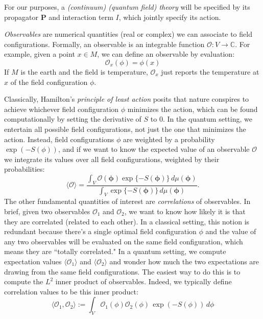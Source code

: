 \documentclass[12pt]{article}
\theoremstyle{definition}
\theoremstyle{plain}
\begin{document}
For our purposes, a \emph{(continuum) (quantum field) theory} will be specified by its propagator $\mathbf{P}$ and interaction term $I$, which jointly specify its action.

\textit{Observables} are numerical quantities (real or complex) we can associate to field configurations. Formally, an observable is an integrable function $\mathcal{O}:V \to \mathbb{C}$.
For example, given a point $x\in M$, we can define an observable by evaluation: 
\begin{equation}
    \mathcal{O}_x(\phi) = \phi(x)
\end{equation}
If $M$ is the earth and the field is temperature, $\mathcal{O}_x$ just reports the temperature at $x$ of the field configuration $\phi$. 

Classically, Hamilton's \textit{principle of least action} posits that nature conspires to achieve whichever field configuration $\phi$ minimizes the action, which can be found computationally by setting the derivative of $S$ to 0. In the quantum setting, we entertain all possible field configurations, not just the one that minimizes the action. Instead, field configurations $\phi$ are weighted by a probability $\exp(-S(\phi))$, and if we want to know the expected value of an observable $\mathcal{O}$ we integrate its values over all field configurations, weighted by their probabilities:
\begin{equation}
    \langle \mathcal{O} \rangle
    = \frac{\int_{V} \mathcal{O}(\boldsymbol\phi) \exp \{-S(\boldsymbol\phi)\} \, d\mu(\boldsymbol\phi)}{\int_{V}  \exp \{-S(\boldsymbol\phi)
    \} \, d\mu(\boldsymbol\phi)}
    .
\end{equation}
The other fundamental quantities of interest are \textit{correlations} of observables. In brief, given two observables $\mathcal{O}_1$ and $\mathcal{O}_2$, we want to know how likely it is that they are correlated (related to each other). In a classical setting, this notion is redundant because there's a single optimal field configuration $\phi$ and the value of any two observables will be evaluated on the same field configuration, which means they are ``totally correlated."
In a quantum setting, we compute expectation values $\langle \mathcal{O}_1\rangle $ and $\langle \mathcal{O}_2\rangle$ and wonder how much the two expectations are drawing from the same field configurations. The easiest way to do this is to compute the $L^2$ inner product of observables. Indeed, we typically define correlation values to be this inner product:
\begin{equation}
    \langle \mathcal{O}_1,\mathcal{O}_2\rangle := \int_V \mathcal{O}_1(\phi)\mathcal{O}_2(\phi)\, \exp(-S(\phi))\,d\phi
\end{equation}
\end{document}
